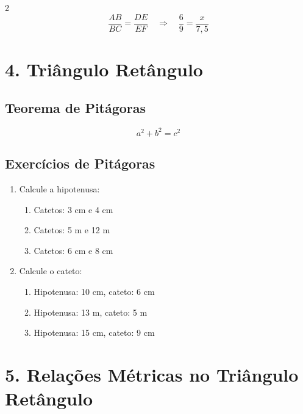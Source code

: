 \documentclass[11pt]{article}
\begin{document}
\begin{multicols}{2}
\[
\frac{AB}{BC} = \frac{DE}{EF} \quad \Rightarrow \quad \frac{6}{9} = \frac{x}{7,5}
\]

\section*{4. Triângulo Retângulo}

\begin{center}
\end{center}

\subsection*{Teorema de Pitágoras}
\[
a^2 + b^2 = c^2
\]

\subsection*{Exercícios de Pitágoras}
\begin{enumerate}
    \item Calcule a hipotenusa:
    \begin{enumerate}[label=\alph*)]
        \item Catetos: 3 cm e 4 cm
        \item Catetos: 5 m e 12 m
        \item Catetos: 6 cm e 8 cm
    \end{enumerate}
    
    \item Calcule o cateto:
    \begin{enumerate}[label=\alph*)]
        \item Hipotenusa: 10 cm, cateto: 6 cm
        \item Hipotenusa: 13 m, cateto: 5 m
        \item Hipotenusa: 15 cm, cateto: 9 cm
    \end{enumerate}
\end{enumerate}

\section*{5. Relações Métricas no Triângulo Retângulo}


\end{multicols}
\end{document}
